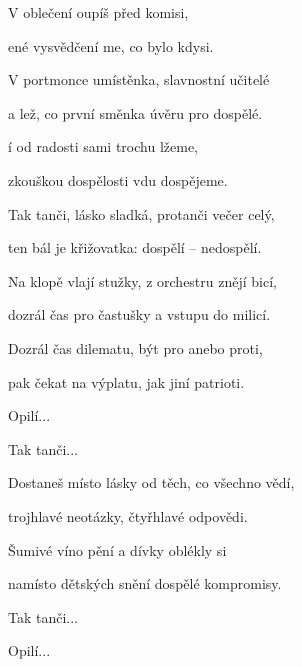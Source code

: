 

\zs
V  oblečení oupíš před komisi,

ené vysvědčení me, co bylo kdysi.
\ks

\zs
V portmonce umístěnka, slavnostní učitelé

a lež, co první směnka úvěru pro dospělé.
\ks

\zr
{}í od radosti  sami trochu lžeme,

 zkouškou dospělosti vdu dospějeme.
\kr

\zr
Tak tanči, lásko sladká, protanči večer celý,

ten bál je křižovatka: dospělí -- nedospělí.
\kr

\zs
Na klopě vlají stužky, z orchestru znějí bicí,

dozrál čas pro častušky a vstupu do milicí.
\ks

\zs
Dozrál čas dilematu, být pro anebo proti,

pak čekat na výplatu, jak jiní patrioti.
\ks

\zr Opilí... \kr

\zr Tak tanči... \kr

\zs
Dostaneš místo lásky od těch, co všechno vědí,

trojhlavé neotázky, čtyřhlavé odpovědi.
\ks

\zr
Šumivé víno pění a dívky oblékly si

namísto dětských snění dospělé kompromisy.
\kr

\zr Tak tanči... \kr

\zr Opilí... \kr

\kp


















